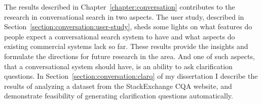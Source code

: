 The results described in Chapter~\ref{chapter:conversation} contributes to the research in conversational search in two aspects.
The user study, described in Section~\ref{section:conversation:user-study}, sheds some lights on what features do people expect a conversational search system to have and what aspects do existing commercial systems lack so far.
These results provide the insights and formulate the directions for future research in the area.
And one of such aspects, that a conversational system should have, is an ability to ask clarification questions.
In Section~\ref{section:conversation:clarq} of my dissertation I describe the results of analyzing a dataset from the StackExchange CQA website, and demonstrate feasibility of generating clarification questions automatically.
